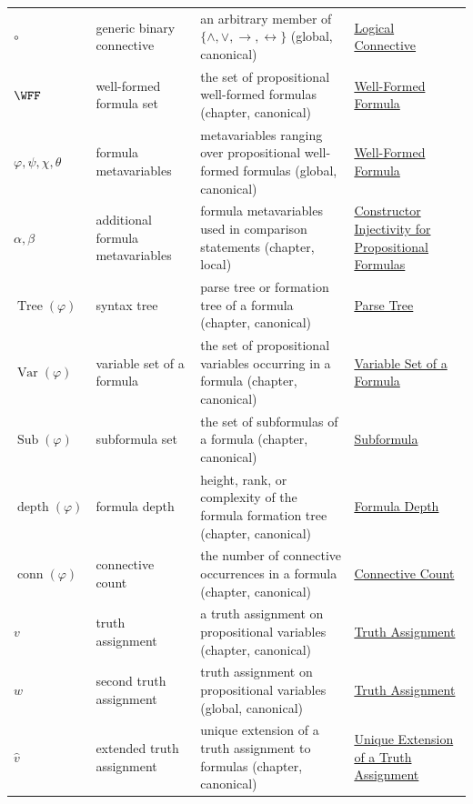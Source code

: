 \begin{longtable}{p{}p{}p{}p{}}
\(\circ\) & generic binary connective & an arbitrary member of \(\{\land,\lor,\to,\leftrightarrow\}\) (global, canonical) & \hyperref[def:logical-connective]{Logical Connective}\\
\(\WFF\) & well-formed formula set & the set of propositional well-formed formulas (chapter, canonical) & \hyperref[def:well-formed-formula]{Well-Formed Formula}\\
\(\varphi,\psi,\chi,\theta\) & formula metavariables & metavariables ranging over propositional well-formed formulas (global, canonical) & \hyperref[def:well-formed-formula]{Well-Formed Formula}\\
\(\alpha,\beta\) & additional formula metavariables & formula metavariables used in comparison statements (chapter, local) & \hyperref[lem:constructor-injectivity-propositional-formulas]{Constructor Injectivity for Propositional Formulas}\\
\(\operatorname{Tree}(\varphi)\) & syntax tree & parse tree or formation tree of a formula (chapter, canonical) & \hyperref[def:parse-tree-propositional-logic]{Parse Tree}\\
\(\operatorname{Var}(\varphi)\) & variable set of a formula & the set of propositional variables occurring in a formula (chapter, canonical) & \hyperref[def:formula-variable-set-propositional-logic]{Variable Set of a Formula}\\
\(\operatorname{Sub}(\varphi)\) & subformula set & the set of subformulas of a formula (chapter, canonical) & \hyperref[def:subformula-propositional-logic]{Subformula}\\
\(\operatorname{depth}(\varphi)\) & formula depth & height, rank, or complexity of the formula formation tree (chapter, canonical) & \hyperref[def:formula-depth-propositional-logic]{Formula Depth}\\
\(\operatorname{conn}(\varphi)\) & connective count & the number of connective occurrences in a formula (chapter, canonical) & \hyperref[def:connective-count-propositional-logic]{Connective Count}\\
\(v\) & truth assignment & a truth assignment on propositional variables (chapter, canonical) & \hyperref[def:truth-assignment-propositional-logic]{Truth Assignment}\\
\(w\) & second truth assignment & truth assignment on propositional variables (global, canonical) & \hyperref[def:truth-assignment-propositional-logic]{Truth Assignment}\\
\(\widehat v\) & extended truth assignment & unique extension of a truth assignment to formulas (chapter, canonical) & \hyperref[thm:unique-extension-truth-assignment-propositional-logic]{Unique Extension of a Truth Assignment}\\

\end{longtable}
